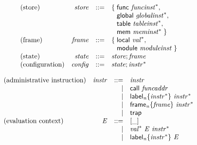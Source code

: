 \vspace{1ex}

$$
\begin{array}{@{}lrrl@{}l@{}}
\mbox{(store)} & {\mathit{store}} &::=& \{\; \begin{array}[t]{@{}l@{}l@{}}
\mathsf{func}~{{\mathit{funcinst}}^\ast},\; \\
  \mathsf{global}~{{\mathit{globalinst}}^\ast},\; \\
  \mathsf{table}~{{\mathit{tableinst}}^\ast},\; \\
  \mathsf{mem}~{{\mathit{meminst}}^\ast} \;\}\end{array} \\
\mbox{(frame)} & {\mathit{frame}} &::=& \{\; \begin{array}[t]{@{}l@{}l@{}}
\mathsf{local}~{{\mathit{val}}^\ast},\; \\
  \mathsf{module}~{\mathit{moduleinst}} \;\}\end{array} \\
\mbox{(state)} & {\mathit{state}} &::=& {\mathit{store}} ; {\mathit{frame}} \\
\mbox{(configuration)} & {\mathit{config}} &::=& {\mathit{state}} ; {{\mathit{instr}}^\ast} \\
\end{array}
$$

\vspace{1ex}

$$
\begin{array}{@{}lrrl@{}l@{}}
\mbox{(administrative instruction)} & {\mathit{instr}} &::=& {\mathit{instr}} \\ &&|&
\mathsf{call}~{\mathit{funcaddr}} \\ &&|&
{{\mathsf{label}}_{{\mathit{n}}}}{\{{{\mathit{instr}}^\ast}\}}~{{\mathit{instr}}^\ast} \\ &&|&
{{\mathsf{frame}}_{{\mathit{n}}}}{\{{\mathit{frame}}\}}~{{\mathit{instr}}^\ast} \\ &&|&
\mathsf{trap} \\
\mbox{(evaluation context)} & {\mathit{E}} &::=& {}[\mathsf{\_}] \\ &&|&
{{\mathit{val}}^\ast}~{\mathit{E}}~{{\mathit{instr}}^\ast} \\ &&|&
{{\mathsf{label}}_{{\mathit{n}}}}{\{{{\mathit{instr}}^\ast}\}}~{\mathit{E}} \\
\end{array}
$$

\vspace{1ex}


